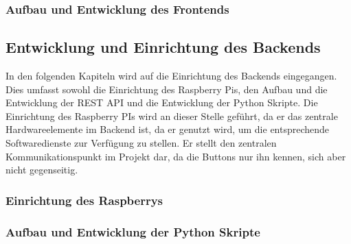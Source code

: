 \subsubsection{Aufbau und Entwicklung des Frontends}  
\label{sec:Aufbau und Entwicklung des Frontends-1}

\newpage

\subsection{Entwicklung und Einrichtung des Backends}  
\label{sec:Entwicklung und Einrichtung des Backends-1} 

In den folgenden Kapiteln wird auf die Einrichtung des Backends eingegangen. Dies umfasst sowohl die Einrichtung des Raspberry Pis, den Aufbau und die Entwicklung der \ac{REST} \ac{API} und die Entwicklung der Python Skripte. Die Einrichtung des Raspberry PIs wird an dieser Stelle geführt, da er das zentrale Hardwareelemente im Backend ist, da er genutzt wird, um die entsprechende Softwaredienste zur Verfügung zu stellen. Er stellt den zentralen Kommunikationspunkt im Projekt dar, da die Buttons nur ihn kennen, sich aber nicht gegenseitig. 

\subsubsection{Einrichtung des Raspberrys}  
\label{sec:Einrichtung des Raspberrys-1}



\subsubsection{Aufbau und Entwicklung der Python Skripte}  
\label{sec:Aufbau und Entwicklung der Python Skripte-1}



\newpage